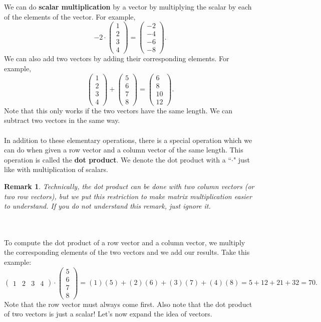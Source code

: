 \documentclass{article}
\newtheorem*{remark}{Remark}
\begin{document}
We can do \textbf{scalar multiplication} by a vector by multiplying the scalar by each of the elements of the vector. For example, 
\[
-2\cdot \begin{pmatrix}
1\\
2\\
3\\
4
\end{pmatrix}
=
\begin{pmatrix}
-2\\
-4\\
-6\\
-8
\end{pmatrix}.
\]
We can also add two vectors by adding their corresponding elements. For example, 
\[
\begin{pmatrix}
1\\
2\\
3\\
4
\end{pmatrix}
+
\begin{pmatrix}
5\\
6\\
7\\
8
\end{pmatrix}=\begin{pmatrix}
6\\
8\\
10\\
12
\end{pmatrix}.
\]
Note that this only works if the two vectors have the same length. We can subtract two vectors in the same way. 
\\
\\
In addition to these elementary operations, there is a special operation which we can do when given a row vector and a column vector of the same length. This operation is called the \textbf{dot product}. We denote the dot product with a ``$\cdot$" just like with multiplication of scalars.
\begin{remark}
Technically, the dot product can be done with two column vectors (or two row vectors), but we put this restriction to make matrix multiplication easier to understand. If you do not understand this remark, just ignore it.
\end{remark}
\\
\\
To compute the dot product of a row vector and a column vector, we multiply the corresponding elements of the two vectors and we add our results. Take this example:
\[\begin{pmatrix}
1 & 2 & 3 & 4
\end{pmatrix}\cdot
\begin{pmatrix}
5\\
6\\
7\\
8
\end{pmatrix}=(1)(5)+(2)(6)+(3)(7)+(4)(8)=5+12+21+32=70.\]
Note that the row vector must always come first. Also note that the dot product of two vectors is just a scalar! Let's now expand the idea of vectors. 
\end{document}
